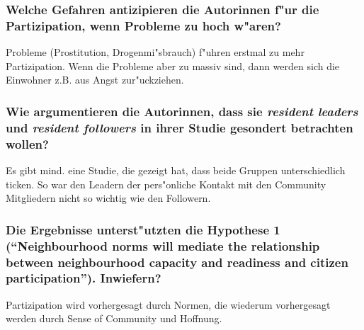 \subsubsection{Welche Gefahren antizipieren die Autorinnen f"ur die Partizipation, wenn Probleme zu hoch w"aren?}
Probleme (Prostitution, Drogenmi"sbrauch) f"uhren erstmal zu mehr Partizipation. Wenn die Probleme aber zu massiv sind, dann werden sich die Einwohner z.B. aus Angst zur"uckziehen.

\subsubsection{Wie argumentieren die Autorinnen, dass sie \emph{resident leaders} und \emph{resident followers} in ihrer Studie gesondert betrachten wollen?}
Es gibt mind. eine Studie, die gezeigt hat, dass beide Gruppen unterschiedlich ticken. So war den Leadern der pers"onliche Kontakt mit den Community Mitgliedern nicht so wichtig wie den Followern.

\subsubsection{Die Ergebnisse unterst"utzten die Hypothese 1 (``Neighbourhood norms will mediate the relationship between neighbourhood capacity and readiness and citizen participation''). Inwiefern?}
Partizipation wird vorhergesagt durch Normen, die wiederum vorhergesagt werden durch Sense of Community und Hoffnung.

